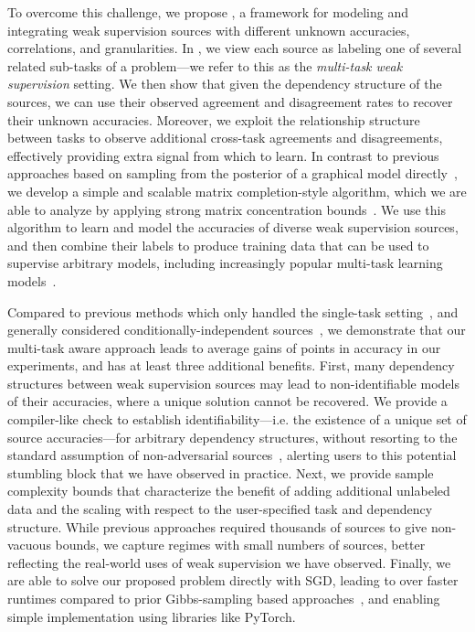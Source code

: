 \documentclass[letterpaper]{article}
\begin{document}
To overcome this challenge, we propose \systemx, a framework for modeling and integrating weak supervision sources with different unknown accuracies, correlations, and granularities.
In \systemx, we view each source as labeling one of several related sub-tasks of a problem---we refer to this as the \textit{multi-task weak supervision} setting.
We then show that given the dependency structure of the sources, we can use their observed agreement and disagreement rates to recover their unknown accuracies.
Moreover, we exploit the relationship structure between tasks to observe additional cross-task agreements and disagreements, effectively providing extra signal from which to learn.
In contrast to previous approaches based on sampling from the posterior of a graphical model directly~\cite{ratner2016data,bach2017learning}, we develop a simple and scalable matrix completion-style algorithm, which we are able to analyze by applying strong matrix concentration bounds~\cite{tropp2015introduction}.
We use this algorithm to learn and model the accuracies of diverse weak supervision sources, and then combine their labels to produce training data that can be used to supervise arbitrary models, including increasingly popular multi-task learning models~\cite{Caruana93multitasklearning,DBLP:journals/corr/Ruder17a}.

Compared to previous methods which only handled the single-task setting~\cite{ratner2016data,ratner2018snorkel}, and generally considered conditionally-independent sources~\cite{anandkumar2014tensor,dawid1979maximum}, we demonstrate that our multi-task aware approach leads to average gains of  points in accuracy in our experiments, and has at least three additional benefits.
First, many dependency structures between weak supervision sources may lead to non-identifiable models of their accuracies, where a unique solution cannot be recovered.
We provide a compiler-like check to establish identifiability---i.e. the existence of a unique set of source accuracies---for arbitrary dependency structures, without resorting to the standard assumption of non-adversarial sources~\cite{dawid1979maximum}, alerting users to this potential stumbling block that we have observed in practice.
Next, we provide sample complexity bounds that characterize the benefit of adding additional unlabeled data and the scaling with respect to the user-specified task and dependency structure.
While previous approaches required thousands of sources to give non-vacuous bounds, we capture regimes with small numbers of sources, better reflecting the real-world uses of weak supervision we have observed.
Finally, we are able to solve our proposed problem directly with SGD, leading to over  faster runtimes compared to prior Gibbs-sampling based approaches~\cite{ratner2016data,platanios2017estimating}, and enabling simple implementation using libraries like PyTorch.
\end{document}
